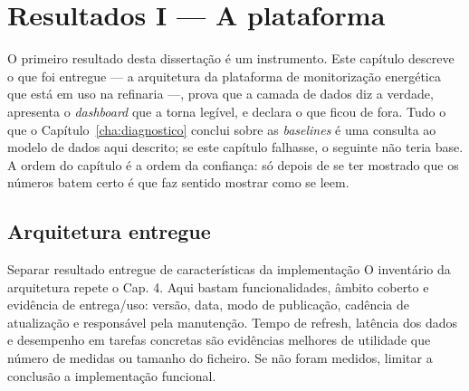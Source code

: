 
\chapter{Resultados I --- A plataforma}
\label{cha:plataforma}

O primeiro resultado desta dissertação é um instrumento. Este capítulo
descreve o que foi entregue --- a arquitetura da plataforma de
monitorização energética que está em uso na refinaria ---, prova que a
camada de dados diz a verdade, apresenta o \emph{dashboard} que a torna
legível, e declara o que ficou de fora. Tudo o que o
Capítulo~\ref{cha:diagnostico} conclui sobre as \emph{baselines} é uma
consulta ao modelo de dados aqui descrito; se este capítulo falhasse, o
seguinte não teria base. A ordem do capítulo é a ordem da confiança: só
depois de se ter mostrado que os números batem certo é que faz sentido
mostrar como se leem.

\section{Arquitetura entregue}
\label{sec:arquitetura}
{Separar resultado entregue de características da implementação}
{O inventário da arquitetura repete o Cap. 4. Aqui bastam funcionalidades,
âmbito coberto e evidência de entrega/uso: versão, data, modo de publicação,
cadência de atualização e responsável pela manutenção. Tempo de refresh,
latência dos dados e desempenho em tarefas concretas são evidências
melhores de utilidade que número de medidas ou tamanho do ficheiro.
Se não foram medidos, limitar a conclusão a implementação funcional.}%


